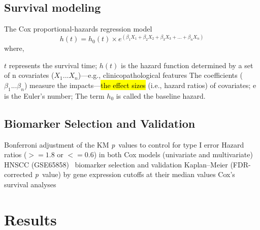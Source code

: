 \documentclass[
paper=landscape,
paper=160mm:90mm, %
fontsize=11pt, %
pagesize, %
parskip=half-, %
]{scrartcl} %
\theoremstyle{mythmstyle} %
\begin{document}
\clearpage

\subsection{Survival modeling}
\large The Cox proportional-hazards regression model~\cite{Cox1972,Andersen1982,Bradburn2003b}\\
$$h(t) = h_0(t) \times e^{(\beta_1 X_1 + \beta_2 X_2 + \beta_3 X_3 + ... + \beta_n X_n)}$$
\noindent where,
\begin{outline} %
\1 $t$ represents the survival time;
\1 $h(t)$ is the hazard function determined by a set of n covariates ($X_1...X_n$)---e.g., clinicopathological features
\1 The coefficients ($\beta_1...\beta_n$) measure the impacts---\hl{the effect sizes} (i.e., hazard ratios) of covariates;
\1 e is the Euler's number;
\1 The term $h_0$ is called the baseline hazard.
\end{outline}


\clearpage

\subsection{Biomarker Selection and Validation}
\begin{outline}


\1 \large Bonferroni adjustment of the KM \textit{p}~values to control for type I error
\1 Hazard ratios ($>=1.8$ or $<=0.6$) in both Cox models (univariate and multivariate)
\1 HNSCC (GSE65858)~\cite{Wichmann2015}
    \2 biomarker selection and validation
    \2 Kaplan--Meier (FDR-corrected \textit{p}~value) by gene expression cutoffs at their median values
    \2 Cox's survival analyses 

\end{outline}
\clearpage



\section{Results}

\clearpage

\thispagestyle{headings}
\end{document}
